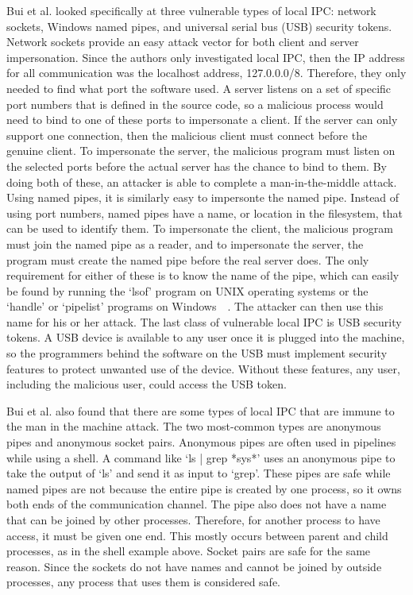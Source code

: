 Bui et al. looked specifically at three vulnerable types of local IPC: network sockets, Windows named pipes, and universal serial bus (USB) security tokens.  Network sockets provide an easy attack vector for both client and server impersonation.  Since the authors only investigated local IPC, then the IP address for all communication was the localhost address, 127.0.0.0/8.  Therefore, they only needed to find what port the software used.  A server listens on a set of specific port numbers that is defined in the source code, so a malicious process would need to bind to one of these ports to impersonate a client.  If the server can only support one connection, then the malicious client must connect before the genuine client.  To impersonate the server, the malicious program must listen on the selected ports before the actual server has the chance to bind to them.  By doing both of these, an attacker is able to complete a man-in-the-middle attack.  Using named pipes, it is similarly easy to impersonte the named pipe.  Instead of using port numbers, named pipes have a name, or location in the filesystem, that can be used to identify them.  To impersonate the client, the malicious program must join the named pipe as a reader, and to impersonate the server, the program must create the named pipe before the real server does.  The only requirement for either of these is to know the name of the pipe, which can easily be found by running the `lsof' program on UNIX operating systems or the `handle' or `pipelist' programs on Windows~\cite{russinovich_2018}~\cite{markruss_sharkey_2016}.  The attacker can then use this name for his or her attack.  The last class of vulnerable local IPC is USB security tokens.  A USB device is available to any user once it is plugged into the machine, so the programmers behind the software on the USB must implement security features to protect unwanted use of the device.  Without these features, any user, including the malicious user, could access the USB token.

Bui et al. also found that there are some types of local IPC that are immune to the man in the machine attack.  The two most-common types are anonymous pipes and anonymous socket pairs.  Anonymous pipes are often used in pipelines while using a shell.  A command like `ls | grep *sys*' uses an anonymous pipe to take the output of `ls' and send it as input to `grep'.  These pipes are safe while named pipes are not because the entire pipe is created by one process, so it owns both ends of the communication channel.  The pipe also does not have a name that can be joined by other processes.  Therefore, for another process to have access, it must be given one end.  This mostly occurs between parent and child processes, as in the shell example above.  Socket pairs are safe for the same reason.  Since the sockets do not have names and cannot be joined by outside processes, any process that uses them is considered safe.

